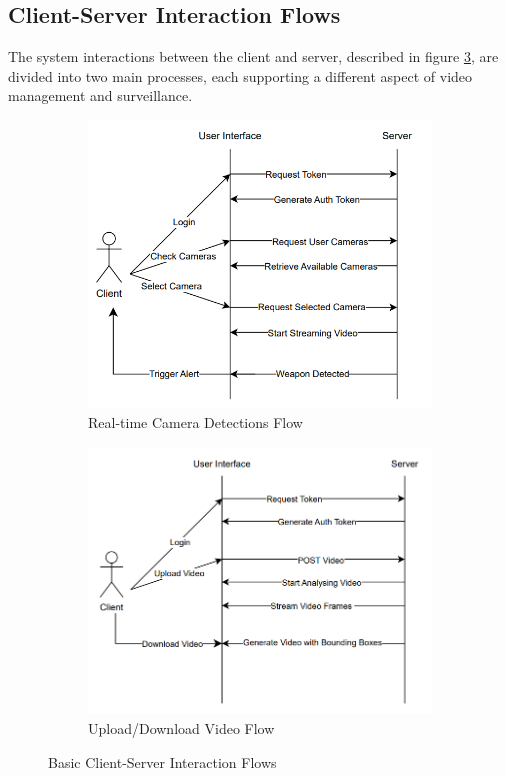 \subsection{Client-Server Interaction Flows}
The system interactions between the client and server, described in figure \ref{fig:flows}, are divided 
into two main processes, each supporting a different aspect of video management and surveillance. 
\begin{figure}[h]
    \centering
    \begin{subfigure}[b]{0.45\textwidth}
        \centering
        \includegraphics[width=\linewidth]{figs/flow1.png}
        \caption{Real-time Camera Detections Flow}
        \label{fig:flow1}
    \end{subfigure}
    \hfill %
    \begin{subfigure}[b]{0.45\textwidth}
        \centering
        \includegraphics[width=\linewidth]{figs/flow2.png}
        \caption{Upload/Download Video Flow}
        \label{fig:flow2}
    \end{subfigure}
    \caption{Basic Client-Server Interaction Flows}
    \label{fig:flows}
\end{figure}

